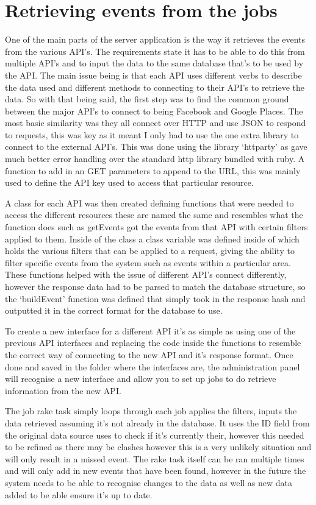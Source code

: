	\section{Retrieving events from the jobs}
		One of the main parts of the server application is the way it retrieves the events from the various API's. The requirements state it has to be able to do this from multiple API's and to input the data to the same database that's to be used by the API. The main issue being is that each API uses different verbs to describe the data used and different methods to connecting to their API's to retrieve the data. So with that being said, the first step was to find the common ground between the major API's to connect to being Facebook and Google Places. The most basic similarity was they all connect over HTTP and use JSON to respond to requests, this was key as it meant I only had to use the one extra library to connect to the external API's. This was done using the library `httparty' as gave much better error handling over the standard http library bundled with ruby. A function to add in an GET parameters to append to the URL, this was mainly used to define the API key used to access that particular resource. 

		A class for each API was then created defining functions that were needed to access the different resources these are named the same and resembles what the function does such as getEvents got the events from that API with certain filters applied to them. Inside of the class a class variable was defined inside of which holds the various filters that can be applied to a request, giving the ability to filter specific events from the system such as events within a particular area. These functions helped with the issue of different API's connect differently, however the response data had to be parsed to match the database structure, so  the `buildEvent' function was defined that simply took in the response hash and outputted it in the correct format for the database to use. 

		To create a new interface for a different API it's as simple as using one of the previous API interfaces and replacing the code inside the functions to resemble the correct way of connecting to the new API and it's response format. Once done and saved in the folder where the interfaces are, the administration panel will recognise a new interface and allow you to set up jobs to do retrieve information from the new API. 

		The job rake task simply loops through each job applies the filters, inputs the data retrieved assuming it's not already in the database. It uses the ID field from the original data source uses to check if it's currently their, however this needed to be refined as there may be clashes however this is a very unlikely situation and will only result in a missed event. The rake task itself can be ran multiple times and will only add in new events that have been found, however in the future the system needs to be able to recognise changes to the data as well as new data added to be able ensure it's up to date. 

